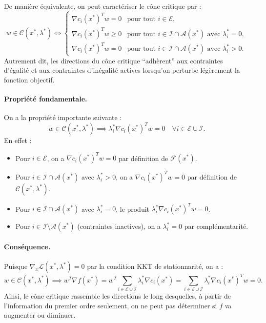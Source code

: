\begin{remarque}
    De manière équivalente, on peut caractériser le cône critique par :
    \begin{equation}
        w \in \mathcal{C}(x^*, \lambda^*) \iff 
        \begin{cases}
            \nabla c_i(x^*)^T w = 0 & \text{pour tout } i \in \mathcal{E}, \\
            \nabla c_i(x^*)^T w \geq 0 & \text{pour tout } i \in \mathcal{I} \cap \mathcal{A}(x^*) \text{ avec } \lambda_i^* = 0, \\
            \nabla c_i(x^*)^T w = 0 & \text{pour tout } i \in \mathcal{I} \cap \mathcal{A}(x^*) \text{ avec } \lambda_i^* > 0.
        \end{cases}
    \end{equation}
    Autrement dit, les directions du cône critique ``adhèrent'' aux contraintes d'égalité et aux contraintes d'inégalité actives lorsqu'on perturbe légèrement la fonction objectif.
    
    \paragraph{Propriété fondamentale.}
    On a la propriété importante suivante :
    \begin{equation}
        w \in \mathcal{C}(x^*, \lambda^*) \implies \lambda_i^* \nabla c_i(x^*)^T w = 0 \quad \forall i \in \mathcal{E} \cup \mathcal{I}.
    \end{equation}
    En effet :
    \begin{itemize}
        \item Pour $i \in \mathcal{E}$, on a $\nabla c_i(x^*)^T w = 0$ par définition de $\mathcal{F}(x^*)$.
        \item Pour $i \in \mathcal{I} \cap \mathcal{A}(x^*)$ avec $\lambda_i^* > 0$, on a $\nabla c_i(x^*)^T w = 0$ par définition de $\mathcal{C}(x^*, \lambda^*)$.
        \item Pour $i \in \mathcal{I} \cap \mathcal{A}(x^*)$ avec $\lambda_i^* = 0$, le produit $\lambda_i^* \nabla c_i(x^*)^T w = 0$.
        \item Pour $i \in \mathcal{I} \setminus \mathcal{A}(x^*)$ (contraintes inactives), on a $\lambda_i^* = 0$ par complémentarité.
    \end{itemize}
    
    \paragraph{Conséquence.} Puisque $\nabla_x \mathcal{L}(x^*, \lambda^*) = 0$ par la condition KKT de stationnarité, on a :
    \begin{equation}
        w \in \mathcal{C}(x^*, \lambda^*) \implies w^T \nabla f(x^*) = w^T \sum_{i \in \mathcal{E} \cup \mathcal{I}} \lambda_i^* \nabla c_i(x^*) = \sum_{i \in \mathcal{E} \cup \mathcal{I}} \lambda_i^* \nabla c_i(x^*)^T w = 0.
    \end{equation}
    Ainsi, le cône critique rassemble les directions le long desquelles, à partir de l'information du premier ordre seulement, on ne peut pas déterminer si $f$ va augmenter ou diminuer.
\end{remarque}

